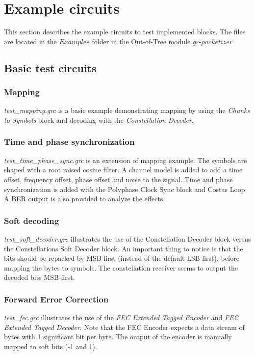 \section{Example circuits}
This section describes the example circuits to test implemented blocks. The files are located in the $Examples$ folder in the Out-of-Tree module $gr$-$packetizer$

\subsection{Basic test circuits}

\subsubsection*{Mapping}
\textit{test\_mapping.grc} is a basic example demonstrating mapping by using the \textit{Chunks to Symbols} block and decoding with the \textit{Constellation Decoder}.

\subsubsection*{Time and phase synchronization}
\textit{test\_time\_phase\_sync.grc} is an extension of mapping example. The symbols are shaped with a root raised cosine filter. A channel model is added to add a time offset, frequency offset, phase offset and noise to the signal. Time and phase synchronization is added with the Polyphase Clock Sync block and Costas Loop. A BER output is also provided to analyze the effects.


\subsubsection*{Soft decoding}
\textit{test\_soft\_decoder.grc} illustrates the use of the {Constellation Decoder} block versus the {Constellations Soft Decoder} block. An important thing to notice is that the bits should be repacked by MSB first (instead of the default LSB first), before mapping the bytes to symbols. The constellation receiver seems to output the decoded bits MSB-first.

\subsubsection*{Forward Error Correction}
\textit{test\_fec.grc} illustrates the use of the \textit{FEC Extended Tagged Encoder} and \textit{FEC Extended Tagged Decoder}. Note that the FEC Encoder expects a data stream of bytes with 1 significant bit per byte. The output of the encoder is manually mapped to soft bits (-1 and 1). \medskip

